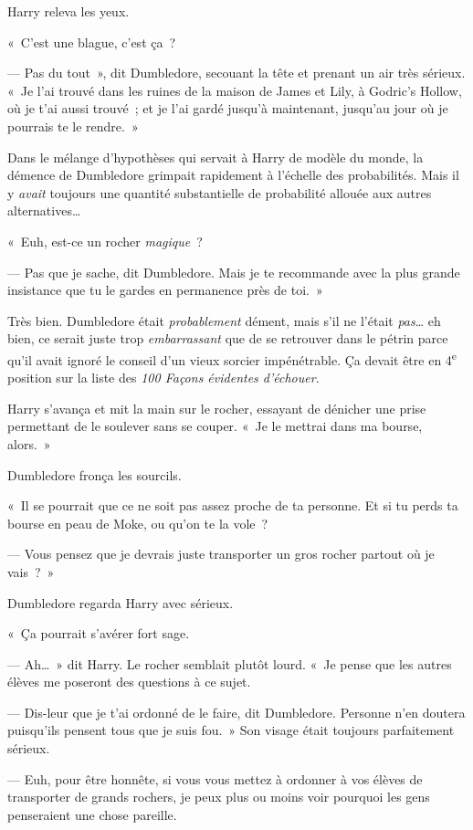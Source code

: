 Harry releva les yeux.

«~C'est une blague, c'est ça~?

--- Pas du tout~», dit Dumbledore, secouant la tête et prenant un air très sérieux. «~Je l'ai trouvé dans les ruines de la maison de James et Lily, à Godric's Hollow, où je t'ai aussi trouvé~; et je l'ai gardé jusqu'à maintenant, jusqu'au jour où je pourrais te le rendre.~»

Dans le mélange d'hypothèses qui servait à Harry de modèle du monde, la démence de Dumbledore grimpait rapidement à l'échelle des probabilités. Mais il y \emph{avait} toujours une quantité substantielle de probabilité allouée aux autres alternatives…

«~Euh, est-ce un rocher \emph{magique}~?

--- Pas que je sache, dit Dumbledore. Mais je te recommande avec la plus grande insistance que tu le gardes en permanence près de toi.~»

Très bien. Dumbledore était \emph{probablement} dément, mais s'il ne l'était \emph{pas}… eh bien, ce serait juste trop \emph{embarrassant} que de se retrouver dans le pétrin parce qu'il avait ignoré le conseil d'un vieux sorcier impénétrable. Ça devait être en 4\textsuperscript{e} position sur la liste des \emph{100 Façons évidentes d'échouer}.

Harry s'avança et mit la main sur le rocher, essayant de dénicher une prise permettant de le soulever sans se couper. «~Je le mettrai dans ma bourse, alors.~»

Dumbledore fronça les sourcils.

«~Il se pourrait que ce ne soit pas assez proche de ta personne. Et si tu perds ta bourse en peau de Moke, ou qu'on te la vole~?

--- Vous pensez que je devrais juste transporter un gros rocher partout où je vais~?~»

Dumbledore regarda Harry avec sérieux.

«~Ça pourrait s'avérer fort sage.

--- Ah…~» dit Harry. Le rocher semblait plutôt lourd. «~Je pense que les autres élèves me poseront des questions à ce sujet.

--- Dis-leur que je t'ai ordonné de le faire, dit Dumbledore. Personne n'en doutera puisqu'ils pensent tous que je suis fou.~» Son visage était toujours parfaitement sérieux.

--- Euh, pour être honnête, si vous vous mettez à ordonner à vos élèves de transporter de grands rochers, je peux plus ou moins voir pourquoi les gens penseraient une chose pareille.

